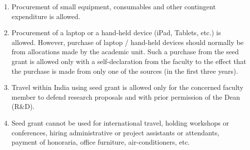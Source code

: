 \documentclass[
  10pt,
  a5paper,
  10pt,
  openany]{amsbook}
\providecommand{\tightlist}{%
  \setlength{\itemsep}{0pt}\setlength{\parskip}{0pt}}
\begin{document}
\begin{enumerate}
\def\labelenumi{\alph{enumi}.}
\tightlist
\item
  Procurement of small equipment, consumables and other contingent
  expenditure is allowed.
\item
  Procurement of a laptop or a hand-held device (iPad, Tablets, etc.) is
  allowed. However, purchase of laptop / hand-held devices should
  normally be from allocations made by the academic unit. Such a
  purchase from the seed grant is allowed only with a self-declaration
  from the faculty to the effect that the purchase is made from only one
  of the sources (in the first three years).
\item
  Travel within India using seed grant is allowed only for the concerned
  faculty member to defend research proposals and with prior permission
  of the Dean (R\&D).
\item
  Seed grant cannot be used for international travel, holding workshops
  or conferences, hiring administrative or project assistants or
  attendants, payment of honoraria, office furniture, air-conditioners,
  etc.
\end{enumerate}
\end{document}
